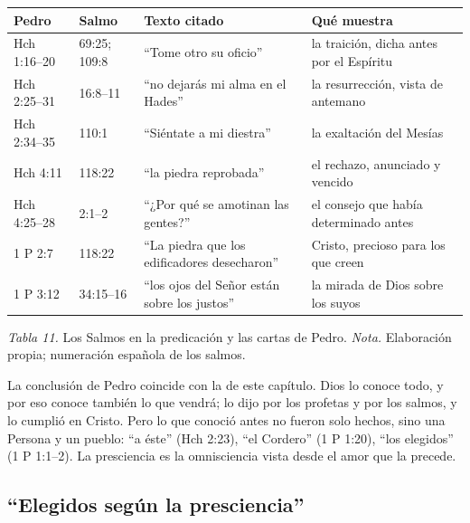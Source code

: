 \begin{center}\small\renewcommand{\arraystretch}{1.2}
\begin{tabular}{@{}L{2.4cm}L{2.6cm}L{4.6cm}L{4.8cm}@{}}
\toprule
\textbf{Pedro} & \textbf{Salmo} & \textbf{Texto citado} & \textbf{Qué muestra} \\ \midrule
Hch 1:16--20 & 69:25; 109:8 & ``Tome otro su oficio'' & la traición, dicha antes por el Espíritu \\
Hch 2:25--31 & 16:8--11 & ``no dejarás mi alma en el Hades'' & la resurrección, vista de antemano \\
Hch 2:34--35 & 110:1 & ``Siéntate a mi diestra'' & la exaltación del Mesías \\
Hch 4:11 & 118:22 & ``la piedra reprobada'' & el rechazo, anunciado y vencido \\
Hch 4:25--28 & 2:1--2 & ``¿Por qué se amotinan las gentes?'' & el consejo que había determinado antes \\
1 P 2:7 & 118:22 & ``La piedra que los edificadores desecharon'' & Cristo, precioso para los que creen \\
1 P 3:12 & 34:15--16 & ``los ojos del Señor están sobre los justos'' & la mirada de Dios sobre los suyos \\
\bottomrule
\end{tabular}\par
{\footnotesize\color{gris}\textit{Tabla 11.} Los Salmos en la predicación y las cartas de Pedro. \textit{Nota.} Elaboración propia; numeración española de los salmos.}
\end{center}

La conclusión de Pedro coincide con la de este capítulo. Dios lo conoce todo, y por eso conoce también lo que vendrá; lo dijo por los profetas y por los salmos, y lo cumplió en Cristo. Pero lo que conoció antes no fueron solo hechos, sino una Persona y un pueblo: ``a éste'' (Hch 2:23), ``el Cordero'' (1 P 1:20), ``los elegidos'' (1 P 1:1--2). La presciencia es la omnisciencia vista desde el amor que la precede.


\subsection{“Elegidos según la presciencia”}

